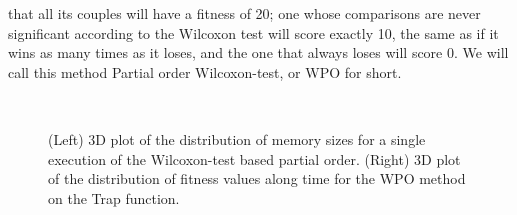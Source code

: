 \documentclass{svmult}
\begin{document}
that all its couples will have a fitness of 20; one whose comparisons
are never significant according to the Wilcoxon test will score
exactly 10, the same as if it wins as many times as it loses, and the
one that always loses will score 0. We will call this method
Partial order Wilcoxon-test, or {\sf WPO} for short.
\begin{figure}[!t] %
\centering
{}
~
\caption{(Left) 3D plot of the distribution of memory sizes for a single
execution of the Wilcoxon-test based partial order. (Right)
3D plot of the distribution of fitness values along time for the WPO
method on the Trap function. \label{fig:initial}}
\end{figure}
\end{document}
